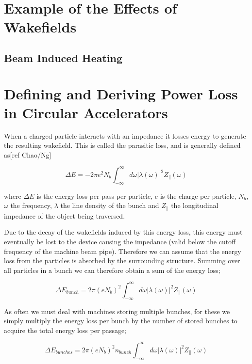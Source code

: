 \section{Example of the Effects of Wakefields}
\subsection{Beam Induced Heating}
\label{sec:beam_induced_heating}
\section{Defining and Deriving Power Loss in Circular Accelerators}
\label{sec:power_loss}

When a charged particle interacts with an impedance it losses energy to generate the resulting wakefield. This is called the parasitic loss, and is generally defined as[ref Chao/Ng]

\begin{equation}
\Delta E = -2\pi e^{2}N_{b}\int^{\infty}_{-\infty} d\omega \left| \lambda \left( \omega \right)  \right|^{2} Z_{\parallel} \left( \omega \right)
\end{equation}

where $\Delta E$ is the energy loss per pass per particle, $e$ is the charge per particle, $N_{b}$, $\omega$ the frequency, $\lambda$ the line density of the bunch and $Z_{\parallel}$ the longitudinal impedance of the object being traversed.
																
Due to the decay of the wakefields induced by this energy loss, this energy must eventually be lost to the device causing the impedance (valid below the cutoff frequency of the machine beam pipe). Therefore we can assume that the energy loss from the particles is absorbed by the surrounding structure. Summing over all particles in a bunch we can therefore obtain a sum of the energy loss;

\begin{equation}
\Delta E_{bunch} = 2\pi \left( eN_{b}   \right)^{2} \int^{\infty}_{-\infty} d\omega \left| \lambda \left( \omega \right)  \right|^{2} Z_{\parallel} \left( \omega \right)
\end{equation}

As often we must deal with machines storing multiple bunches, for these we simply multiply the energy loss per bunch by the number of stored bunches to acquire the total energy loss per passage;

\begin{equation}
\Delta E_{bunches} = 2\pi \left( eN_{b}   \right)^{2}n_{bunch} \int^{\infty}_{-\infty} d\omega \left| \lambda \left( \omega \right)  \right|^{2} Z_{\parallel} \left( \omega \right)
\end{equation}

